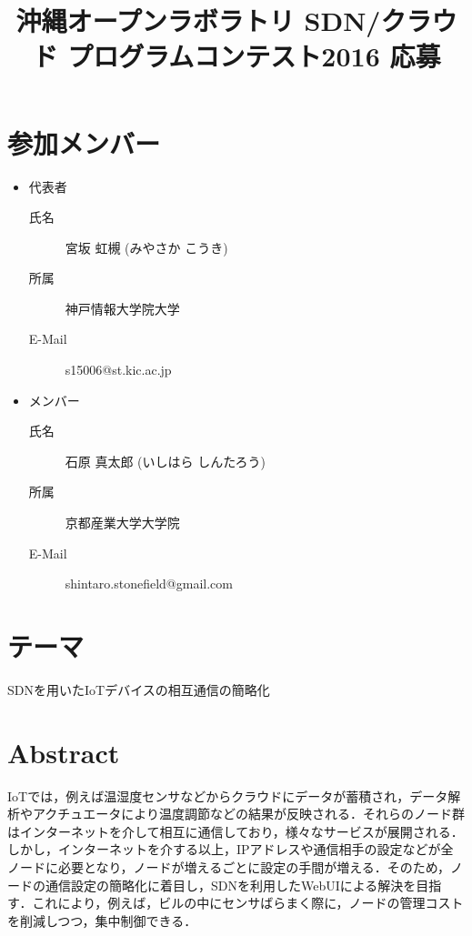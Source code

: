 \documentclass{jsarticle}
\begin{document}
\title{沖縄オープンラボラトリ SDN/クラウド プログラムコンテスト2016 応募}
\maketitle

\section{参加メンバー}
\begin{itemize}
	\item 代表者
		\begin{description}
			\item[氏名] 宮坂 虹槻 (みやさか こうき)
			\item[所属] 神戸情報大学院大学
			\item[E-Mail] s15006@st.kic.ac.jp
		\end{description}
	\item メンバー
		\begin{description}
			\item[氏名] 石原 真太郎 (いしはら しんたろう)
			\item[所属] 京都産業大学大学院
			\item[E-Mail] shintaro.stonefield@gmail.com
		\end{description}
\end{itemize}

\section{テーマ}
	SDNを用いたIoTデバイスの相互通信の簡略化

\section{Abstract}
IoTでは，例えば温湿度センサなどからクラウドにデータが蓄積され，データ解析やアクチュエータにより温度調節などの結果が反映される．それらのノード群はインターネットを介して相互に通信しており，様々なサービスが展開される．しかし，インターネットを介する以上，IPアドレスや通信相手の設定などが全ノードに必要となり，ノードが増えるごとに設定の手間が増える．そのため，ノードの通信設定の簡略化に着目し，SDNを利用したWebUIによる解決を目指す．これにより，例えば，ビルの中にセンサばらまく際に，ノードの管理コストを削減しつつ，集中制御できる．
\end{document}
